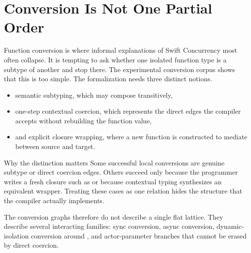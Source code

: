 \section{Conversion Is Not One Partial Order}
\label{sec:conversion}

Function conversion is where informal explanations of Swift Concurrency most often collapse. It is tempting to ask whether one isolated function type is a subtype of another and stop there. The experimental conversion corpus shows that this is too simple. The formalization needs three distinct notions.

\begin{itemize}
  \item semantic subtyping, which may compose transitively,
  \item one-step contextual coercion, which represents the direct edges the compiler accepts without rebuilding the function value,
  \item and explicit closure wrapping, where a new function is constructed to mediate between source and target.
\end{itemize}

\begin{definitionbox}{Why the distinction matters}
Some successful local conversions are genuine subtype or direct coercion edges. Others succeed only because the programmer writes a fresh closure such as  or because contextual typing synthesizes an equivalent wrapper. Treating these cases as one relation hides the structure that the compiler actually implements.
\end{definitionbox}

The conversion graphs therefore do not describe a single flat lattice. They describe several interacting families: sync conversion, async conversion, dynamic-isolation conversion around , and actor-parameter branches that cannot be erased by direct coercion.



